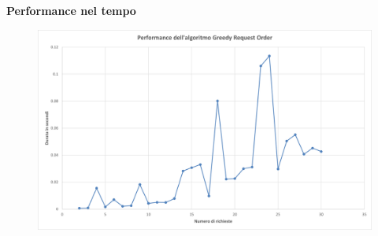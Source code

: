 \documentclass[9pt]{beamer}
\begin{document}
\begin{frame}[allowframebreaks]{\subsecname}
	\textbf{Performance nel tempo}
      	\begin{figure}[h]
	\centering
	\includegraphics[width=\textwidth]
	{../charts/05 Performance dell'algoritmo Greedy Request Order}
	\end{figure}

\end{frame}
\end{document}
